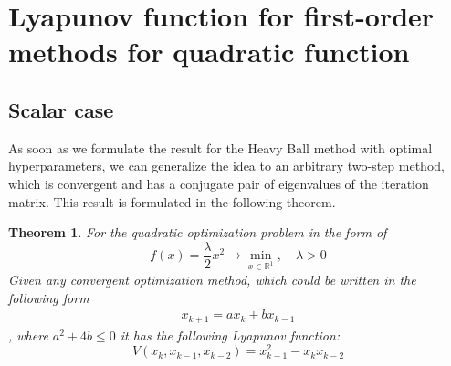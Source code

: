 \documentclass[a4paper,11pt]{article}
\newtheorem{theorem}{Theorem}[section]
\begin{document}
\section{Lyapunov function for first-order methods for quadratic function}

\subsection{Scalar case}
As soon as we formulate the result for the Heavy Ball method with optimal hyperparameters, we can generalize the idea to an arbitrary two-step method, which is convergent and has a conjugate pair of eigenvalues of the iteration matrix. This result is formulated in the following theorem.

\begin{theorem}
 \label{oplyap:th:scalar_lyapunov}
 For the quadratic optimization problem in the form of
 \[
 f(x) = \frac\lambda2 x^2 \to \min_{x \in \mathbb{R}^1}, \quad \lambda >0
 \]
 Given any convergent optimization method, which could be written in the following form
 \begin{align}
 \label{oplyap:eq:two_step_scalar}
 x_{k+1} = a x_k + b x_{k-1}
 \end{align}
 , where $a^2 + 4b \leq 0$ it has the following Lyapunov function:
 \[
 V(x_k, x_{k-1}, x_{k-2}) = x_{k-1}^2 - x_k x_{k-2} 
 \]
\end{theorem}
\end{document}
